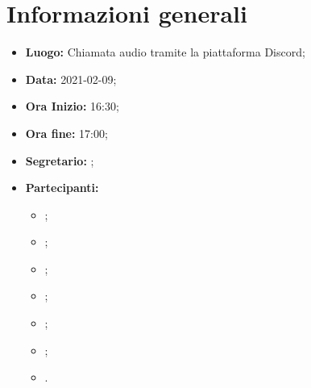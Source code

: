 \section{Informazioni generali}
	\begin{itemize}
		\item \textbf{Luogo:} Chiamata audio tramite la piattaforma Discord;
		\item \textbf{Data:} 2021-02-09;
		\item \textbf{Ora Inizio:} 16:30;
		\item \textbf{Ora fine:} 17:00;
		\item \textbf{Segretario:} \VAS;
		\item \textbf{Partecipanti:}
		\begin{itemize}
			\item \MB ;
			\item \VAS ;
			\item \FD ;
			\item \NM ;
			\item \SB ;
			\item \GB ;
			\item \MDI .
		\end{itemize}
		
	\end{itemize}